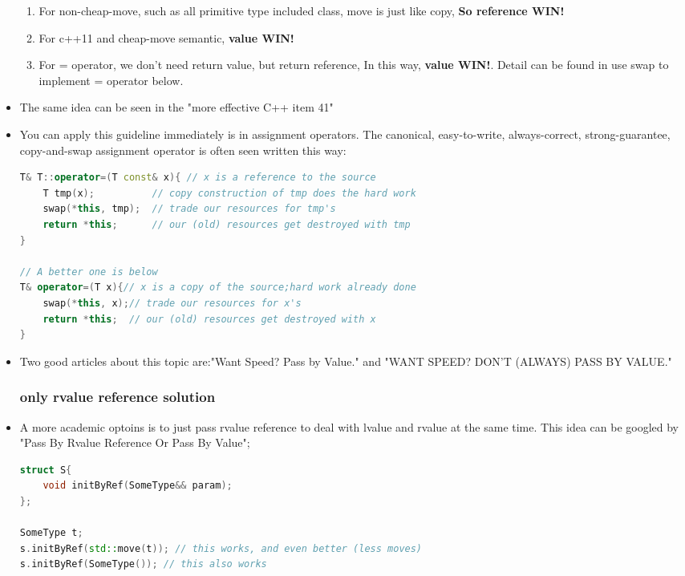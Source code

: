 \documentclass[a4paper,11pt,twoside]{book}
\begin{document}
\begin{itemize}
\begin{enumerate}
	\item For non-cheap-move, such as all primitive type included class, move is just like copy, \textbf{So reference WIN!}
	
	\item For c++11 and cheap-move semantic, \textbf{value WIN!}
	
	\item For = operator, we don't need return value, but return reference, In this way, \textbf{value WIN!}. Detail can be found in use swap to implement = operator below. 
	
\end{enumerate}


\item The same idea can be seen in the "more effective C++ item 41" 

\item You can apply this guideline immediately is in assignment operators. The canonical, easy-to-write, always-correct, strong-guarantee, copy-and-swap assignment operator is often seen written this way:
\begin{lstlisting}[frame=single, language=c++]
T& T::operator=(T const& x){ // x is a reference to the source
	T tmp(x);          // copy construction of tmp does the hard work
	swap(*this, tmp);  // trade our resources for tmp's
	return *this;      // our (old) resources get destroyed with tmp 
}

// A better one is below
T& operator=(T x){// x is a copy of the source;hard work already done
	swap(*this, x);// trade our resources for x's
	return *this;  // our (old) resources get destroyed with x
}
\end{lstlisting}

\item Two good articles about this topic are:"Want Speed? Pass by Value." and "WANT SPEED? DON'T (ALWAYS) PASS BY VALUE."

\subsubsection{only rvalue  reference solution}
\item A more academic optoins is to just pass rvalue  reference to deal with lvalue and rvalue at the same time. This idea can be googled by "Pass By Rvalue Reference Or Pass By Value";
\begin{lstlisting}[frame=single, language=c++]
struct S{
    void initByRef(SomeType&& param);
};

SomeType t;
s.initByRef(std::move(t)); // this works, and even better (less moves)
s.initByRef(SomeType()); // this also works
\end{lstlisting}


\end{itemize}
\end{document}
